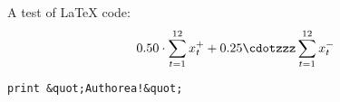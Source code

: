 A test of LaTeX code: \[ 0.50 \cdot \sum_{t = 1}^{12} x_t^+ + 0.25 \cdotzzz \sum_{t = 1}^{12} x_t^- \] 

\verb|print &quot;Authorea!&quot;|
  
  
  